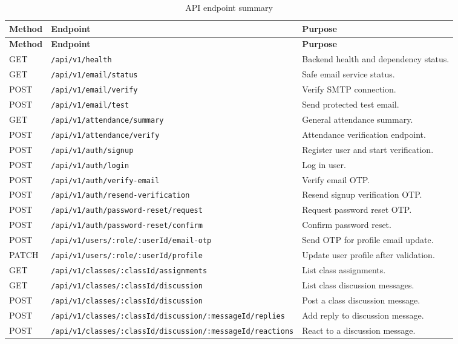\begin{longtable}{p{2cm} p{6.2cm} p{5.5cm}}
\caption{API endpoint summary}
\label{tab:api-summary}\\
\toprule
\textbf{Method} & \textbf{Endpoint} & \textbf{Purpose}\\
\midrule
\endfirsthead
\toprule
\textbf{Method} & \textbf{Endpoint} & \textbf{Purpose}\\
\midrule
\endhead
GET & \texttt{/api/v1/health} & Backend health and dependency status.\\
GET & \texttt{/api/v1/email/status} & Safe email service status.\\
POST & \texttt{/api/v1/email/verify} & Verify SMTP connection.\\
POST & \texttt{/api/v1/email/test} & Send protected test email.\\
GET & \texttt{/api/v1/attendance/summary} & General attendance summary.\\
POST & \texttt{/api/v1/attendance/verify} & Attendance verification endpoint.\\
POST & \texttt{/api/v1/auth/signup} & Register user and start verification.\\
POST & \texttt{/api/v1/auth/login} & Log in user.\\
POST & \texttt{/api/v1/auth/verify-email} & Verify email OTP.\\
POST & \texttt{/api/v1/auth/resend-verification} & Resend signup verification OTP.\\
POST & \texttt{/api/v1/auth/password-reset/request} & Request password reset OTP.\\
POST & \texttt{/api/v1/auth/password-reset/confirm} & Confirm password reset.\\
POST & \texttt{/api/v1/users/:role/:userId/email-otp} & Send OTP for profile email update.\\
PATCH & \texttt{/api/v1/users/:role/:userId/profile} & Update user profile after validation.\\
GET & \texttt{/api/v1/classes/:classId/assignments} & List class assignments.\\
GET & \texttt{/api/v1/classes/:classId/discussion} & List class discussion messages.\\
POST & \texttt{/api/v1/classes/:classId/discussion} & Post a class discussion message.\\
POST & \texttt{/api/v1/classes/:classId/discussion/:messageId/replies} & Add reply to discussion message.\\
POST & \texttt{/api/v1/classes/:classId/discussion/:messageId/reactions} & React to a discussion message.\\

\end{longtable}
